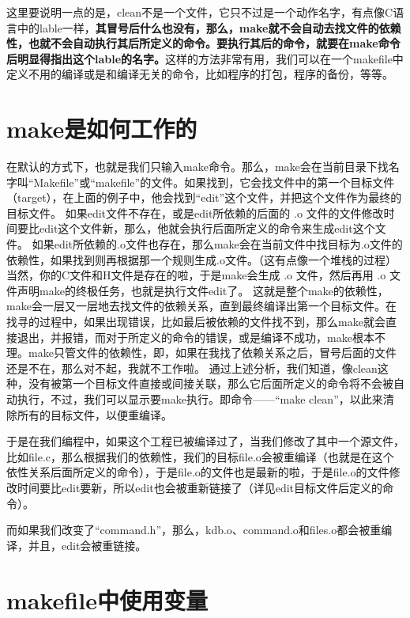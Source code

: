 \documentclass[]{book}
\begin{document}
这里要说明一点的是，clean不是一个文件，它只不过是一个动作名字，有点像C语言中的lable一样，\textbf{其冒号后什么也没有，那么，make就不会自动去找文件的依赖性，也就不会自动执行其后所定义的命令。要执行其后的命令，就要在make命令后明显得指出这个lable的名字。}这样的方法非常有用，我们可以在一个makefile中定义不用的编译或是和编译无关的命令，比如程序的打包，程序的备份，等等。

\hypertarget{makeux662fux5982ux4f55ux5de5ux4f5cux7684}{%
\section{make是如何工作的}\label{makeux662fux5982ux4f55ux5de5ux4f5cux7684}}

在默认的方式下，也就是我们只输入make命令。那么，make会在当前目录下找名字叫``Makefile''或``makefile''的文件。如果找到，它会找文件中的第一个目标文件（target），在上面的例子中，他会找到``edit''这个文件，并把这个文件作为最终的目标文件。
如果edit文件不存在，或是edit所依赖的后面的 .o 文件的文件修改时间要比edit这个文件新，那么，他就会执行后面所定义的命令来生成edit这个文件。
如果edit所依赖的.o文件也存在，那么make会在当前文件中找目标为.o文件的依赖性，如果找到则再根据那一个规则生成.o文件。（这有点像一个堆栈的过程）
当然，你的C文件和H文件是存在的啦，于是make会生成 .o 文件，然后再用 .o 文件声明make的终极任务，也就是执行文件edit了。
这就是整个make的依赖性，make会一层又一层地去找文件的依赖关系，直到最终编译出第一个目标文件。在找寻的过程中，如果出现错误，比如最后被依赖的文件找不到，那么make就会直接退出，并报错，而对于所定义的命令的错误，或是编译不成功，make根本不理。make只管文件的依赖性，即，如果在我找了依赖关系之后，冒号后面的文件还是不在，那么对不起，我就不工作啦。
通过上述分析，我们知道，像clean这种，没有被第一个目标文件直接或间接关联，那么它后面所定义的命令将不会被自动执行，不过，我们可以显示要make执行。即命令------``make clean''，以此来清除所有的目标文件，以便重编译。

于是在我们编程中，如果这个工程已被编译过了，当我们修改了其中一个源文件，比如file.c，那么根据我们的依赖性，我们的目标file.o会被重编译（也就是在这个依性关系后面所定义的命令），于是file.o的文件也是最新的啦，于是file.o的文件修改时间要比edit要新，所以edit也会被重新链接了（详见edit目标文件后定义的命令）。

而如果我们改变了``command.h''，那么，kdb.o、command.o和files.o都会被重编译，并且，edit会被重链接。

\hypertarget{makefileux4e2dux4f7fux7528ux53d8ux91cf}{%
\section{makefile中使用变量}\label{makefileux4e2dux4f7fux7528ux53d8ux91cf}}
\end{document}

